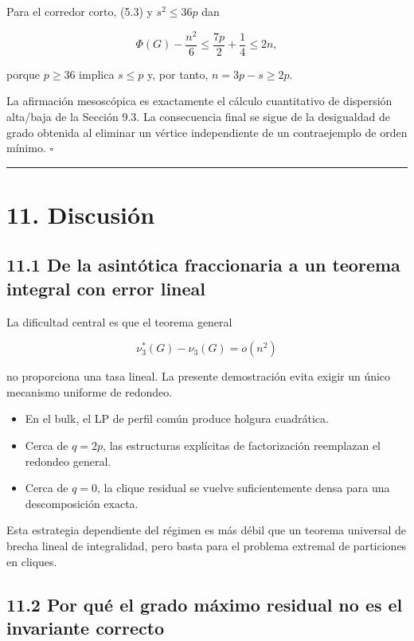 \documentclass[
  11pt,
]{article}
\providecommand{\tightlist}{%
  \setlength{\itemsep}{0pt}\setlength{\parskip}{0pt}}
\begin{document}
Para el corredor corto, (5.3) y \(s^2\le36p\) dan

\[
\Phi(G)-\frac{n^2}{6}
\le
\frac{7p}{2}+\frac14
\le
2n,
\]

porque \(p\ge36\) implica \(s\le p\) y, por tanto, \(n=3p-s\ge2p\).

La afirmación mesoscópica es exactamente el cálculo cuantitativo de
dispersión alta/baja de la Sección 9.3. La consecuencia final se sigue
de la desigualdad de grado obtenida al eliminar un vértice independiente
de un contraejemplo de orden mínimo. \(\square\)

\begin{center}\rule{0.5\linewidth}{0.5pt}\end{center}

\section{11. Discusión}\label{discusiuxf3n}

\subsection{11.1 De la asintótica fraccionaria a un teorema integral con
error
lineal}\label{de-la-asintuxf3tica-fraccionaria-a-un-teorema-integral-con-error-lineal}

La dificultad central es que el teorema general

\[
\nu_3^*(G)-\nu_3(G)=o(n^2)
\]

no proporciona una tasa lineal. La presente demostración evita exigir un
único mecanismo uniforme de redondeo.

\begin{itemize}
\tightlist
\item
  En el bulk, el LP de perfil común produce holgura cuadrática.
\item
  Cerca de \(q=2p\), las estructuras explícitas de factorización
  reemplazan el redondeo general.
\item
  Cerca de \(q=0\), la clique residual se vuelve suficientemente densa
  para una descomposición exacta.
\end{itemize}

Esta estrategia dependiente del régimen es más débil que un teorema
universal de brecha lineal de integralidad, pero basta para el problema
extremal de particiones en cliques.

\subsection{11.2 Por qué el grado máximo residual no es el invariante
correcto}\label{por-quuxe9-el-grado-muxe1ximo-residual-no-es-el-invariante-correcto}
\end{document}
